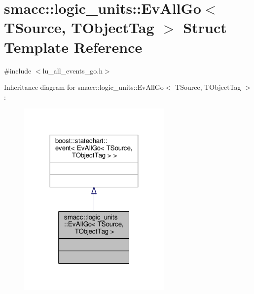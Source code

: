 \hypertarget{structsmacc_1_1logic__units_1_1EvAllGo}{}\section{smacc\+:\+:logic\+\_\+units\+:\+:Ev\+All\+Go$<$ T\+Source, T\+Object\+Tag $>$ Struct Template Reference}
\label{structsmacc_1_1logic__units_1_1EvAllGo}


{\ttfamily \#include $<$lu\+\_\+all\+\_\+events\+\_\+go.\+h$>$}



Inheritance diagram for smacc\+:\+:logic\+\_\+units\+:\+:Ev\+All\+Go$<$ T\+Source, T\+Object\+Tag $>$\+:\nopagebreak
\begin{figure}[H]
\begin{center}
\leavevmode
\includegraphics[width=214pt]{structsmacc_1_1logic__units_1_1EvAllGo__inherit__graph}
\end{center}
\end{figure}


